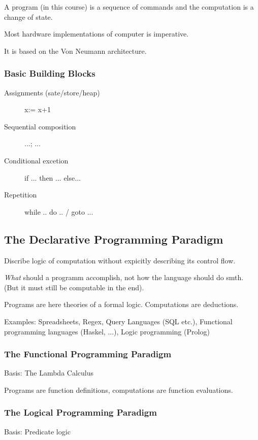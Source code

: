 A program (in this course) is a sequence of commands and the computation is a change of state.

Most hardware implementations of computer is imperative.

It is based on the Von Neumann architecture.

\subsubsection{Basic Building Blocks}

\begin{description}
	\item[Assignments (sate/store/heap)] x:= x+1 %
	\item[Sequential composition] ...; ...
	\item[Conditional excetion] if ... then ... else...
	\item[Repetition] while .. do .. / goto ...
\end{description}



\subsection{The Declarative Programming Paradigm}

Discribe logic of computation without expicitly describing its control flow.

\emph{What} should a programm accomplish, not how the language should do smth. (But it must still be computable in the end).

Programs are here theories of a formal logic. Computations are deductions.

Examples: Spreadsheets, Regex, Query Languages (SQL etc.), Functional programming languages (Haskel, ...), Logic programming (Prolog)

\subsubsection{The Functional Programming Paradigm}

Basis: The Lambda Calculus

Programs are function definitions, computations are function evaluations.

\subsubsection{The Logical Programming Paradigm}
Basis: Predicate logic

